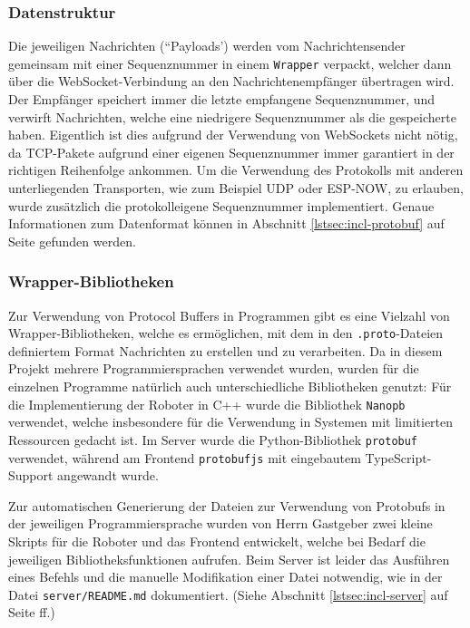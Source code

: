 \subsubsection{Datenstruktur}
Die jeweiligen Nachrichten (``Payloads')
werden vom Nachrichtensender gemeinsam mit einer Sequenznummer in einem \texttt{Wrapper} verpackt,
welcher dann über die WebSocket-Verbindung an den Nachrichtenempfänger übertragen wird.
%
Der Empfänger speichert immer die letzte empfangene Sequenznummer,
und verwirft Nachrichten,
welche eine niedrigere Sequenznummer als die gespeicherte haben.
%
Eigentlich ist dies aufgrund der Verwendung von WebSockets nicht nötig,
da TCP-Pakete aufgrund einer eigenen Sequenznummer immer garantiert in der richtigen Reihenfolge ankommen.
%
Um die Verwendung des Protokolls mit anderen unterliegenden Transporten,
wie zum Beispiel UDP oder ESP-NOW,
zu erlauben,
wurde zusätzlich die protokolleigene Sequenznummer implementiert.
%
Genaue Informationen zum Datenformat können in Abschnitt
\ref{lstsec:incl-protobuf} auf Seite
\pageref{lstsec:incl-protobuf} gefunden werden.

\subsubsection{Wrapper-Bibliotheken}
Zur Verwendung von Protocol Buffers in Programmen gibt es eine Vielzahl von Wrapper-Bibliotheken,
welche es ermöglichen,
mit dem in den \texttt{.proto}-Dateien definiertem Format
Nachrichten zu erstellen und zu verarbeiten.
%
Da in diesem Projekt mehrere Programmiersprachen verwendet wurden,
wurden für die einzelnen Programme natürlich auch unterschiedliche Bibliotheken genutzt:
%
Für die Implementierung der Roboter in C++ wurde die Bibliothek \texttt{Nanopb} verwendet,
welche insbesondere für die Verwendung in Systemen mit limitierten Ressourcen gedacht ist.
%
Im Server wurde die Python-Bibliothek \texttt{protobuf} verwendet,
während am Frontend \texttt{protobufjs} mit eingebautem TypeScript-Support angewandt wurde.

Zur automatischen Generierung der Dateien zur Verwendung von Protobufs in der jeweiligen Programmiersprache
wurden von Herrn Gastgeber zwei kleine Skripts für die Roboter und das Frontend entwickelt,
welche bei Bedarf die jeweiligen Bibliotheksfunktionen aufrufen.
%
Beim Server ist leider das Ausführen eines Befehls und die manuelle Modifikation einer Datei notwendig,
wie in der Datei \texttt{server/README.md} dokumentiert. (Siehe Abschnitt \ref{lstsec:incl-server} auf Seite \pageref{lstsec:incl-server} ff.) 


